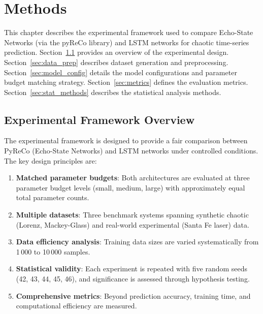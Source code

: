 \section{Methods\label{chapter3}}

This chapter describes the experimental framework used to compare Echo-State Networks (via the pyReCo library) and LSTM networks for chaotic time-series prediction. Section~\ref{sec:framework} provides an overview of the experimental design. Section~\ref{sec:data_prep} describes dataset generation and preprocessing. Section~\ref{sec:model_config} details the model configurations and parameter budget matching strategy. Section~\ref{sec:metrics} defines the evaluation metrics. Section~\ref{sec:stat_methods} describes the statistical analysis methods.

\subsection{Experimental Framework Overview}
\label{sec:framework}

The experimental framework is designed to provide a fair comparison between PyReCo (Echo-State Networks) and LSTM networks under controlled conditions. The key design principles are:

\begin{enumerate}
    \item \textbf{Matched parameter budgets}: Both architectures are evaluated at three parameter budget levels (small, medium, large) with approximately equal total parameter counts.
    \item \textbf{Multiple datasets}: Three benchmark systems spanning synthetic chaotic (Lorenz, Mackey-Glass) and real-world experimental (Santa Fe laser) data.
    \item \textbf{Data efficiency analysis}: Training data sizes are varied systematically from 1\,000 to 10\,000 samples.
    \item \textbf{Statistical validity}: Each experiment is repeated with five random seeds (42, 43, 44, 45, 46), and significance is assessed through hypothesis testing.
    \item \textbf{Comprehensive metrics}: Beyond prediction accuracy, training time, and computational efficiency are measured.
\end{enumerate}

